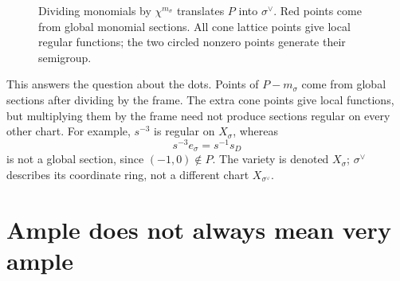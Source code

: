 \documentclass[11pt]{article}
\theoremstyle{definition}
\theoremstyle{remark}
\begin{document}
\begin{figure}[htbp]
    \centering
    \caption{Dividing monomials by \(\chi^{m_\sigma}\) translates \(P\) into
    \(\sigma^\vee\). Red points come from global monomial sections.
    All cone lattice points give local regular functions; the two circled
    nonzero points generate their semigroup.}
    \label{fig:oct19-diagram4}
\end{figure}

This answers the question about the dots. Points of \(P-m_\sigma\)
come from global sections after dividing by the frame. The extra cone
points give local functions, but multiplying them by the frame need
not produce sections regular on every other chart. For example,
\(s^{-3}\) is regular on \(X_\sigma\), whereas
\[
    s^{-3}e_\sigma=s^{-1}s_D
\]
is not a global section, since \((-1,0)\notin P\).
The variety is denoted \(X_\sigma\); \(\sigma^\vee\) describes its
coordinate ring, not a different chart \(X_{\sigma^\vee}\).

\section{Ample does not always mean very ample}
\end{document}
